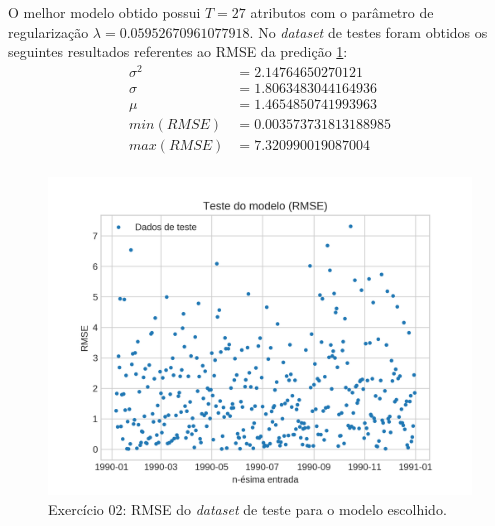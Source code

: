 \documentclass{article}
\begin{document}
    O melhor modelo obtido possui $T=27$ atributos com o parâmetro de regularização $\lambda=0.05952670961077918$.
    No \textit{dataset} de testes foram obtidos os seguintes resultados referentes ao RMSE da predição \ref{fig:ex2_rmse}:
    \begin{align}
        \sigma^2&=2.14764650270121\\
        \sigma&=1.8063483044164936\\
        \mu&=1.4654850741993963\\
        min(RMSE)&=0.003573731813188985\\
        max(RMSE)&=7.320990019087004\\
    \end{align}
    \begin{figure}[!h]
        \centering
        \includegraphics[width=\linewidth]{ex02/model_rmse.png}
        \caption{Exercício 02: RMSE do \textit{dataset} de teste para o modelo escolhido.}
        \label{fig:ex2_rmse}
    \end{figure}
\end{document}
